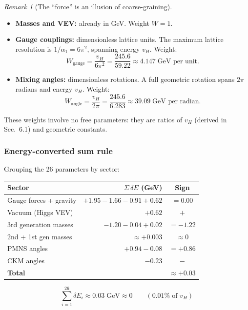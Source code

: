 \documentclass[12pt]{article}
\theoremstyle{remark}
\newtheorem{remark}[theorem]{Remark}
\theoremstyle{definition}
\begin{document}
\begin{remark}[The ``force'' is an illusion of coarse-graining]
\begin{itemize}
\item \textbf{Masses and VEV:} already in GeV. Weight $W = 1$.
\item \textbf{Gauge couplings:} dimensionless lattice units. The maximum lattice resolution is $1/\alpha_1 = 6\pi^2$, spanning energy $v_H$. Weight:
\begin{equation}
W_\text{gauge} = \frac{v_H}{6\pi^2} = \frac{245.6}{59.22} \approx 4.147\;\text{GeV per unit}.
\end{equation}
\item \textbf{Mixing angles:} dimensionless rotations. A full geometric rotation spans $2\pi$ radians and energy $v_H$. Weight:
\begin{equation}
W_\text{angle} = \frac{v_H}{2\pi} = \frac{245.6}{6.283} \approx 39.09\;\text{GeV per radian}.
\end{equation}
\end{itemize}

These weights involve no free parameters: they are ratios of $v_H$ (derived in Sec.~6.1) and geometric constants.

\subsubsection{Energy-converted sum rule}

Grouping the 26 parameters by sector:

\begin{center}
\begin{tabular}{lrc}
\hline
Sector & $\Sigma\,\delta E$ (GeV) & Sign \\
\hline
Gauge forces + gravity & $+1.95 - 1.66 - 0.91 + 0.62$ & $= 0.00$ \\
Vacuum (Higgs VEV) & $+0.62$ & $+$ \\
3rd generation masses & $-1.20 - 0.04 + 0.02$ & $= -1.22$ \\
2nd + 1st gen masses & $\approx +0.003$ & $\approx 0$ \\
PMNS angles & $+0.94 - 0.08$ & $= +0.86$ \\
CKM angles & $-0.23$ & $-$ \\
\hline
\textbf{Total} & & $\approx \mathbf{+0.03}$ \\
\hline
\end{tabular}
\end{center}

\begin{equation}
\boxed{\sum_{i=1}^{26} \delta E_i \approx 0.03\;\text{GeV} \approx 0 \qquad (0.01\%\;\text{of } v_H)}
\end{equation}


\end{remark}
\end{document}
